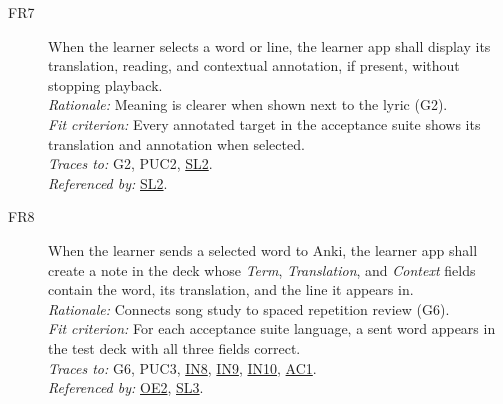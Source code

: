 \documentclass[12pt]{article}
\newcommand{\rat}[1]{\\\textit{Rationale:} #1}
\newcommand{\fit}[1]{\\\textit{Fit criterion:} #1}
\newcommand{\trace}[1]{\\\textit{Traces to:} #1}
\newcommand{\usedby}[1]{\\\textit{Referenced by:} #1}
\newcommand{\reqdef}[1]{\hypertarget{req:#1}{#1}}
\newcommand{\req}[1]{\hyperlink{req:#1}{#1}}
\begin{document}
\begin{description}
\item[\reqdef{FR7}] When the learner selects a word or line, the learner app shall
display its translation, reading, and contextual annotation, if present,
without stopping playback.
\rat{Meaning is clearer when shown next to the lyric (G2).}
\fit{Every annotated target in the acceptance suite shows its translation and
annotation when selected.}
\trace{G2, PUC2, \req{SL2}.}
\usedby{\req{SL2}.}

\item[\reqdef{FR8}] When the learner sends a selected word to Anki, the learner app
shall create a note in the \progname{} deck whose \emph{Term},
\emph{Translation}, and \emph{Context} fields contain the word, its
translation, and the line it appears in.
\rat{Connects song study to spaced repetition review (G6).}
\fit{For each acceptance suite language, a sent word appears in the test deck
with all three fields correct.}
\trace{G6, PUC3, \req{IN8}, \req{IN9}, \req{IN10}, \req{AC1}.}
\usedby{\req{OE2}, \req{SL3}.}
\end{description}
\end{document}
